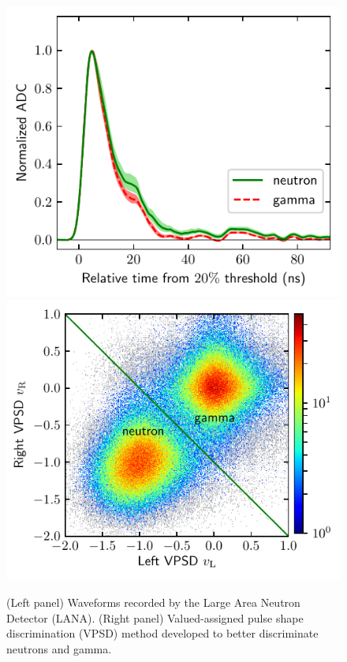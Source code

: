 \documentclass[%
10pt]{article}
\begin{document}
\begin{figure}[htb!]
\centering
\includegraphics[width=0.49\linewidth]{figures/psd_median_pulse_shapes.pdf}
\includegraphics[width=0.49\linewidth]{figures/psd_2d_vpsd.pdf}
\caption{
(Left panel) Waveforms recorded by the Large Area Neutron Detector (LANA).  (Right panel) Valued-assigned pulse shape discrimination (VPSD) method developed to better discriminate neutrons and gamma.
}
\end{figure}



\clearpage
\newpage
\end{document}
